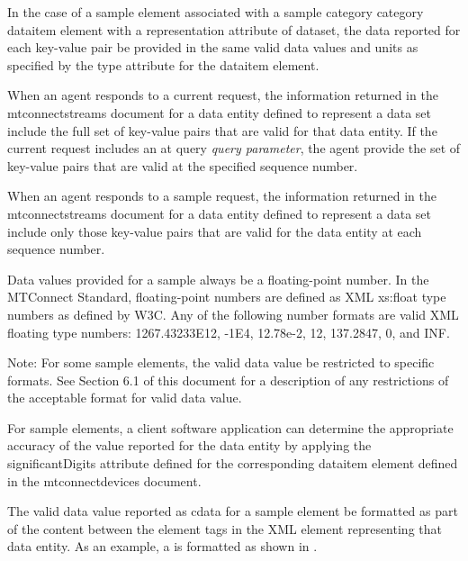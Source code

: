 In the case of a \gls{sample} element associated with a \gls{sample category} category \gls{dataitem} element with a \gls{representation} attribute of \gls{dataset}, the data reported for each \gls{key-value pair} \MUST be provided in the same \glspl{valid data value} and units as specified by the \gls{type} attribute for the \gls{dataitem} element.

When an \gls{agent} responds to a \gls{current request}, the information returned in the \gls{mtconnectstreams} document for a \gls{data entity} defined to represent a \gls{data set} \MUST include the full set of \glspl{key-value pair} that are valid for that \gls{data entity}. If the \gls{current request} includes an \gls{at query} \textit{query parameter}, the \gls{agent} \MUST provide the set of \glspl{key-value pair} that are valid at the specified \gls{sequence number}.

When an \gls{agent} responds to a \gls{sample request}, the information returned in the \gls{mtconnectstreams} document for a \gls{data entity} defined to represent a \gls{data set} \MUST include only those \glspl{key-value pair} that are valid for the \gls{data entity} at each \gls{sequence number}. 

Data values provided for a \gls{sample} \must always be a floating-point number.   In the MTConnect Standard, floating-point numbers are defined as XML xs:float \gls{type} numbers as defined by W3C.  Any of the following number formats are valid XML floating \gls{type} numbers: 1267.43233E12, -1E4, 12.78e-2, 12, 137.2847, 0, and INF.  

\begin{note}
Note: For some \gls{sample} elements, the \gls{valid data value} \may be restricted to specific formats.  See Section 6.1 of this document for a description of any restrictions of the acceptable format for \gls{valid data value}.

\end{note}

For \gls{sample} elements, a client software application can determine the appropriate accuracy of the value reported for the \gls{data entity} by applying the significantDigits attribute defined for the corresponding \gls{dataitem} element defined in the \gls{mtconnectdevices} document.

The \gls{valid data value} reported as \gls{cdata} for a \gls{sample} element \must be formatted as part of the content between the element tags in the XML element representing that \gls{data entity}.  As an example, a  is formatted as shown in .

